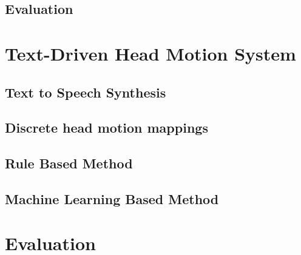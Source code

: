 \documentclass[bsc,frontabs,twoside,singlespacing,parskip]{infthesis}     %
\begin{document}
\section{Evaluation}


\chapter{Text-Driven Head Motion System}

\section{Text to Speech Synthesis}
\section{Discrete head motion mappings}
\section{Rule Based Method}
\section{Machine Learning Based Method}

\chapter{Evaluation}

\section{}
\section{}
\section{}



\end{document}
